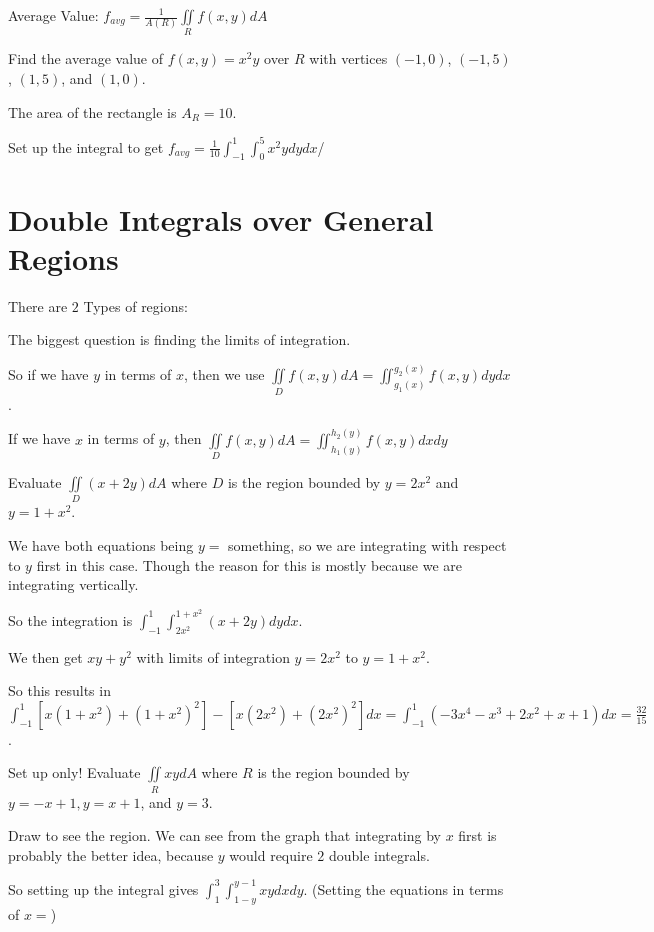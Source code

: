 \documentclass[../calc3.tex]{subfiles}
\begin{document}
Average Value: $f_{avg}=\frac{1}{A(R)}\iint\limits_{R} f(x,y)dA$

\pagebreak
\begin{example}
    Find the average value of $f(x,y)=x^2y$ over $R$ with vertices $(-1,0)$, $(-1,5)$, $(1,5)$, and $(1,0)$.

    The area of the rectangle is $A_R=10$.

    Set up the integral to get $f_{avg}=\frac{1}{10}\int_{-1}^1 \int_0^5 x^2y dydx$/
\end{example}

\section{Double Integrals over General Regions}
There are $2$ Types of regions:

The biggest question is finding the limits of integration.

So if we have $y$ in terms of $x$, then we use $\iint\limits_{D} f(x,y)dA = \iint_{g_1(x)}^{g_2(x)}f(x,y)dydx$.

If we have $x$ in terms of $y$, then $\iint\limits_{D} f(x,y)dA=\iint_{h_1(y)}^{h_2(y)} f(x,y)dxdy$

\begin{example}
    Evaluate $\iint\limits_{D} (x+2y)dA$ where $D$ is the region bounded by $y=2x^2$ and $y=1+x^2$.

    We have both equations being $y=$ something, so we are integrating with respect to $y$ first in this case. Though the reason for this is mostly because we are integrating vertically.

    So the integration is $\int_{-1}^1 \int_{2x^2}^{1+x^2}(x+2y)dydx$.

    We then get $xy+y^2$ with limits of integration $y=2x^2$ to $y=1+x^2$.

    So this results in $\int_{-1}^1 [x(1+x^2)+(1+x^2)^2]-[x(2x^2)+(2x^2)^2]dx = \int_{-1}^1 (-3x^4-x^3+2x^2+x+1)dx = \frac{32}{15}$.
\end{example}

\begin{example}
    Set up only! Evaluate $\iint\limits_{R} xydA$ where $R$ is the region bounded by $y=-x+1, y=x+1$, and $y=3$.

    Draw to see the region. We can see from the graph that integrating by $x$ first is probably the better idea, because $y$ would require $2$ double integrals.

    So setting up the integral gives $\int_1^3 \int_{1-y}^{y-1}xy dxdy$. (Setting the equations in terms of $x=$)
\end{example}
\end{document}
